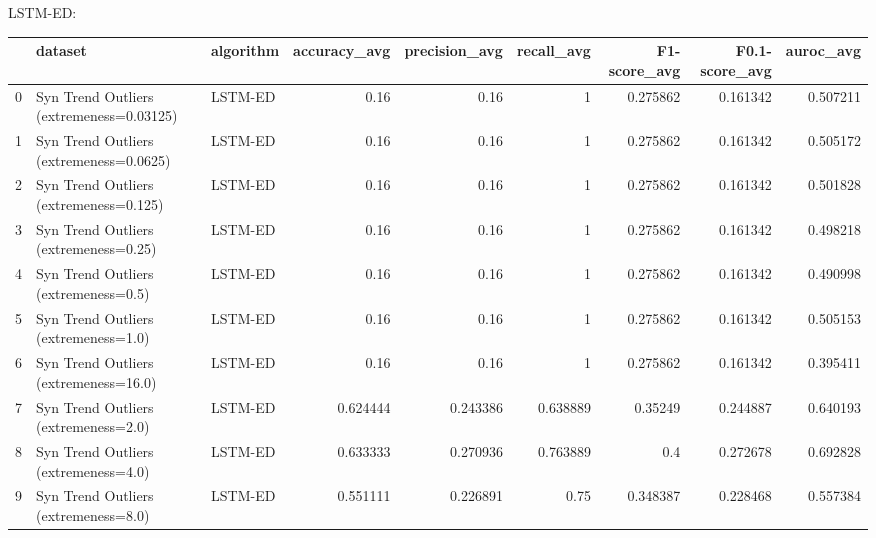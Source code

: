 LSTM-ED:

\begin{tabular}{rllrrrrrr}
\hline
    & dataset                                  & algorithm   &   accuracy\_avg &   precision\_avg &   recall\_avg &   F1-score\_avg &   F0.1-score\_avg &   auroc\_avg \\
\hline
  0 & Syn Trend Outliers (extremeness=0.03125) & LSTM-ED     &       0.16     &        0.16     &     1        &       0.275862 &         0.161342 &    0.507211 \\
  1 & Syn Trend Outliers (extremeness=0.0625)  & LSTM-ED     &       0.16     &        0.16     &     1        &       0.275862 &         0.161342 &    0.505172 \\
  2 & Syn Trend Outliers (extremeness=0.125)   & LSTM-ED     &       0.16     &        0.16     &     1        &       0.275862 &         0.161342 &    0.501828 \\
  3 & Syn Trend Outliers (extremeness=0.25)    & LSTM-ED     &       0.16     &        0.16     &     1        &       0.275862 &         0.161342 &    0.498218 \\
  4 & Syn Trend Outliers (extremeness=0.5)     & LSTM-ED     &       0.16     &        0.16     &     1        &       0.275862 &         0.161342 &    0.490998 \\
  5 & Syn Trend Outliers (extremeness=1.0)     & LSTM-ED     &       0.16     &        0.16     &     1        &       0.275862 &         0.161342 &    0.505153 \\
  6 & Syn Trend Outliers (extremeness=16.0)    & LSTM-ED     &       0.16     &        0.16     &     1        &       0.275862 &         0.161342 &    0.395411 \\
  7 & Syn Trend Outliers (extremeness=2.0)     & LSTM-ED     &       0.624444 &        0.243386 &     0.638889 &       0.35249  &         0.244887 &    0.640193 \\
  8 & Syn Trend Outliers (extremeness=4.0)     & LSTM-ED     &       0.633333 &        0.270936 &     0.763889 &       0.4      &         0.272678 &    0.692828 \\
  9 & Syn Trend Outliers (extremeness=8.0)     & LSTM-ED     &       0.551111 &        0.226891 &     0.75     &       0.348387 &         0.228468 &    0.557384 \\
\hline
\end{tabular}

